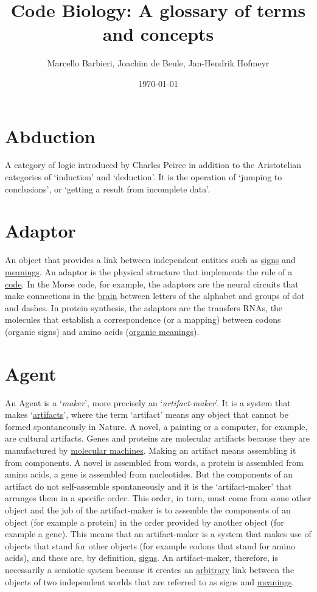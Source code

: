 \documentclass[12pt]{article}
\title{Code Biology: A glossary of terms and concepts}
\author{Marcello Barbieri, Joachim de Beule, Jan-Hendrik Hofmeyr}
\date{\today}
\begin{document}
\maketitle

\setcounter{secnumdepth}{0}
\tableofcontents

\newpage

\hypertarget{abduction}{}
\section{Abduction}
A category of logic introduced by Charles Peirce in addition to the Aristotelian categories of `induction' and `deduction'. It is the operation of `jumping to conclusions', or `getting a result from incomplete data'. 


\hypertarget{adaptor}{}
\section{Adaptor}
An object that provides a link between independent entities such as \hyperlink{signs}{signs} and \hyperlink{meaning}{meanings}. An adaptor is the physical structure that implements the rule of a \hyperlink{code}{code}. In the Morse code, for example, the adaptors are the neural circuits that make connections in the \hyperlink{brain}{brain} between letters of the alphabet and groups of dot and dashes. In protein synthesis, the adaptors are the transfers RNAs, the molecules that establish a correspondence (or a mapping) between codons (organic signs) and amino acids (\hyperlink{organic_meaning}{organic meanings}). 


\hypertarget{agent}{}
\section{Agent}
An Agent is a `\textit{maker}', more precisely an `\textit{artifact-maker}'. It is a system that makes `\hyperlink{artifacts}{artifacts}', where the term `artifact' means any object that cannot be formed spontaneously in Nature. A novel, a painting or a computer, for example, are cultural artifacts. Genes and proteins are molecular artifacts because they are manufactured by \hyperlink{molecular_machines}{molecular machines}. Making an artifact means assembling it from components. A novel is assembled from words, a protein is assembled from amino acids, a gene is assembled from nucleotides. But the components of an artifact do not self-assemble spontaneously and it is the `artifact-maker' that arranges them in a specific order. This order, in turn, must come from some other object and the job of the artifact-maker is to assemble the components of an object (for example a protein) in the order provided by another object (for example a gene). This means that an artifact-maker is a system that makes use of objects that stand for other objects (for example codons that stand for amino acids), and these are, by definition, \hyperlink{signs}{signs}. An artifact-maker, therefore, is necessarily a semiotic system because it creates an \hyperlink{arbitrariness}{arbitrary} link between the objects of two independent worlds that are referred to as signs and \hyperlink{meaning}{meanings}.
\end{document}
